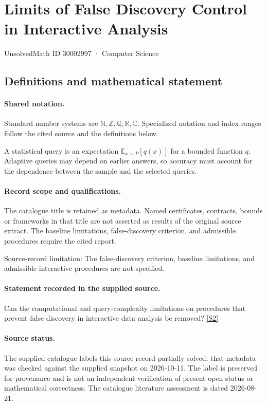 \documentclass[11pt]{article}
\newcommand{\sref}[2]{\hyperlink{source:#1:#2}{[S#2]}}
\begin{document}
\setcounter{section}{30002996}
\section{Limits of False Discovery Control in Interactive Analysis}\label{30002997}
{\small\sffamily UnsolvedMath ID 30002997 · Computer Science}
\subsection{Definitions and mathematical statement}

\paragraph{Shared notation.}Standard number systems are $\mathbb N,\mathbb Z,\mathbb Q,\mathbb R,\mathbb C$. Specialized notation and index ranges follow the cited source and the definitions below.


A statistical query is an expectation $\mathbb E_{x\sim P}[q(x)]$ for a bounded function $q$. Adaptive queries may depend on earlier answers, so accuracy must account for the dependence between the sample and the selected queries.
\paragraph{Record scope and qualifications.}
The catalogue title is retained as metadata. Named certificates, contracts, bounds or frameworks in that title are not asserted as results of the original source extract.
The baseline limitations, false-discovery criterion, and admissible procedures require the cited report.

Source-record limitation: The false-discovery criterion, baseline limitations, and admissible interactive procedures are not specified.
\paragraph{Statement recorded in the supplied source.}
Can the computational and query-complexity limitations on procedures that prevent false discovery in interactive data analysis be removed? \sref{30002997}{2}
\paragraph{Source status.}
The supplied catalogue labels this source record partially solved; that metadata was checked against the supplied snapshot on 2026-10-11. The label is preserved for provenance and is not an independent verification of present open status or mathematical correctness. The catalogue literature assessment is dated 2026-08-21.
\end{document}
